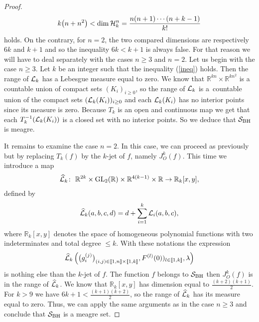 \documentclass[pdftex]{sigma}%
\numberwithin{equation}{section}
\begin{document}
\begin{proof}
	\begin{gather}\label{ineq}
	k\big(n+n^2\big)<\operatorname{dim}{\cal H}_k^n=\frac{n(n+1)\cdots(n+k-1)}{k!}
	\end{gather}
	holds.
	On the contrary, for $n=2$, the two compared dimensions are respectively $6k$ and $k+1$ and so the inequality $6k<k+1$ is always false. For that reason we will have to deal separately with the cases $n\geq 3$ and $n=2$.
	Let us begin with the case $n\geq 3$.
	Let $k$ be an integer such that the inequality (\ref{ineq}) holds. Then the range of ${\cal L}_k$ has a Lebesgue measure equal to zero. We know that $\mathbb{R}^{kn}\times\mathbb{R}^{kn^2}$ is a countable union of compact sets $(K_i)_{i\geq0}$, so the range of ${\cal L}_k$ is a~countable union of the compact sets $({\cal L}_k(K_i))_{i\geq0}$ and each ${\cal L}_k(K_i)$ has no interior points since its measure is zero. Because $T_k$ is an open and continuous map we get that each $T_k^{-1}({\cal L}_k(K_i))$ is a closed set with no interior points. So we deduce that ${\cal S}_{\rm BH}$ is meagre.
	
	It remains to examine the case $n=2$. In this case, we can proceed as previously but by replacing $T_k(f)$ by the $k$-jet of $f$, namely $J^k_O(f)$. This time we introduce a map
\begin{gather*}
\widehat{\cal L}_k\colon\ \mathbb{R}^{2k}\times {\rm GL}_2(\mathbb{R})\times\mathbb{R}^{4(k-1)}\times\mathbb{R}\to\mathbb{R}_k[x,y],
\end{gather*}
	defined by
\begin{gather*}
\widehat{\cal L}_k(a,b,c,d)=d+\sum_{i=1}^{k}{\cal L}_i(a,b,c),
\end{gather*}
	where $\mathbb{R}_k[x,y]$ denotes the space of homogeneous polynomial functions with two indeterminates and total degree $\leq k$.
	With these notations the expression
\begin{gather*}
\widehat{\cal L}_k\left(\big(g_i^{(j)}\big)_{(i,j)\in[\![1,n]\!]\times[\![1,k]\!]},F^{(l)}(0))_{l\in[\![1,k]\!]},\lambda\right)
\end{gather*}
	is nothing else than the $k$-jet of $f$. The function $f$ belongs to ${\cal S}_{\rm BH}$ then $J^k_O(f)$ is in the range of $\widehat{\cal L}_k$.
	We know that $\mathbb{R}_k[x,y]$ has dimension equal to $\frac{(k+2)(k+1)}{2}$. For $k>9$ we have $6k+1<\frac{(k+1)(k+2)}{2}$, so the range of $\widehat{\cal L}_k$ has its measure equal to zero. Thus, we can apply the same arguments as in the case $n\geq3$ and conclude that ${\cal S}_{\rm BH}$ is a meagre set.
\end{proof}
\end{document}

